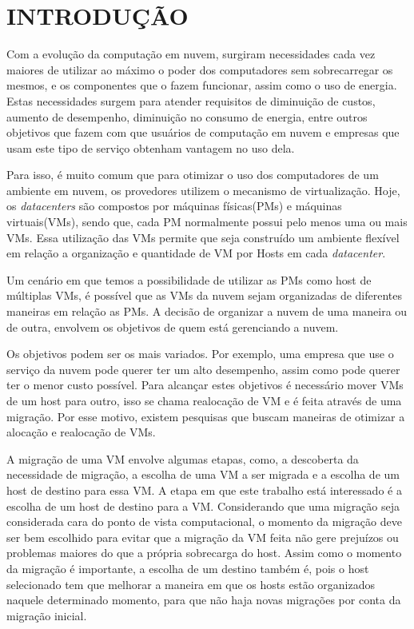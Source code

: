 \chapter{INTRODUÇÃO}
\label{chap:introducao}

Com a evolução da computação em nuvem, surgiram necessidades cada vez maiores de utilizar ao 
máximo o poder dos computadores sem sobrecarregar os mesmos, e os componentes que o fazem funcionar,
assim como o uso de energia. Estas necessidades surgem para atender 
requisitos de diminuição de custos, aumento de desempenho, diminuição no consumo de energia,
entre outros objetivos que fazem com que usuários de computação em nuvem e empresas que usam 
este tipo de serviço obtenham vantagem no uso dela.

Para isso, é muito comum que para otimizar o uso dos computadores de um ambiente em nuvem, 
os provedores utilizem o mecanismo de virtualização. Hoje, os \textit{datacenters} são compostos 
por máquinas físicas(PMs) e máquinas virtuais(VMs), sendo que, cada PM normalmente possui 
pelo menos uma ou mais VMs. Essa utilização das VMs permite que seja construído um ambiente flexível
em relação a organização e quantidade de VM por Hosts em cada \textit{datacenter}.

Um cenário em que temos a possibilidade de utilizar as PMs como host de múltiplas VMs,
é possível que as VMs da nuvem sejam organizadas de diferentes maneiras em relação as PMs. A decisão
de organizar a nuvem de uma maneira ou de outra, envolvem os objetivos de quem está gerenciando a nuvem. 
 
 Os objetivos podem ser os mais variados. Por exemplo, uma empresa que 
 use o serviço da nuvem pode querer ter um alto desempenho, assim como pode querer ter o menor custo 
 possível. Para alcançar estes objetivos é necessário mover VMs de um host para outro, isso se chama
 realocação de VM e é feita através de uma migração. 
 Por esse motivo, existem pesquisas que buscam maneiras de otimizar a alocação e realocação de VMs.

A migração de uma VM envolve algumas etapas, como, a descoberta da necessidade de migração, 
a escolha de uma VM a ser migrada e a escolha de um host de destino para essa VM.
A etapa em que este trabalho está interessado é a escolha de um host de destino para a VM. 
Considerando que uma migração seja considerada cara do ponto de vista computacional, 
o momento da migração deve ser bem escolhido para evitar que a migração da VM feita não gere  
prejuízos ou problemas maiores do que a própria sobrecarga do host. 
Assim como o momento da migração é importante, a escolha de um destino também é, 
pois o host selecionado tem que melhorar a maneira em que os hosts estão organizados naquele determinado momento, 
para que não haja novas migrações por conta da migração inicial.

